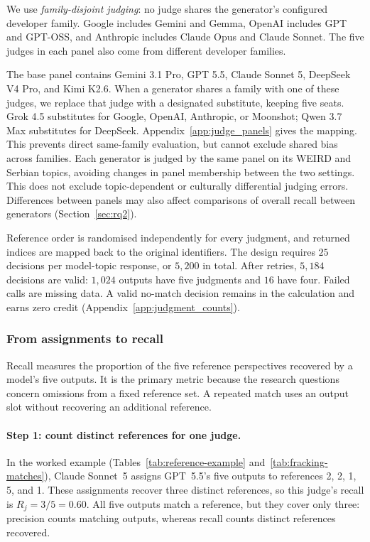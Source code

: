 \documentclass[11pt,a4paper]{article}
\begin{document}
We use \emph{family-disjoint judging}: no judge shares the generator's configured developer family. Google includes Gemini and Gemma, OpenAI includes GPT and GPT-OSS, and Anthropic includes Claude Opus and Claude Sonnet. The five judges in each panel also come from different developer families.

The base panel contains Gemini 3.1 Pro, GPT 5.5, Claude Sonnet 5, DeepSeek V4 Pro, and Kimi K2.6. When a generator shares a family with one of these judges, we replace that judge with a designated substitute, keeping five seats. Grok 4.5 substitutes for Google, OpenAI, Anthropic, or Moonshot; Qwen 3.7 Max substitutes for DeepSeek. Appendix~\ref{app:judge_panels} gives the mapping. This prevents direct same-family evaluation, but cannot exclude shared bias across families. Each generator is judged by the same panel on its WEIRD and Serbian topics, avoiding changes in panel membership between the two settings. This does not exclude topic-dependent or culturally differential judging errors. Differences between panels may also affect comparisons of overall recall between generators (Section~\ref{sec:rq2}).

Reference order is randomised independently for every judgment, and returned indices are mapped back to the original identifiers. The design requires $25$ decisions per model-topic response, or $5{,}200$ in total. After retries, $5{,}184$ decisions are valid: $1{,}024$ outputs have five judgments and $16$ have four. Failed calls are missing data. A valid no-match decision remains in the calculation and earns zero credit (Appendix~\ref{app:judgment_counts}).

\subsubsection{From assignments to recall}
\label{sec:recall}
Recall measures the proportion of the five reference perspectives recovered by a model's five outputs. It is the primary metric because the research questions concern omissions from a fixed reference set. A repeated match uses an output slot without recovering an additional reference.

\paragraph{Step 1: count distinct references for one judge.}
In the worked example (Tables~\ref{tab:reference-example} and~\ref{tab:fracking-matches}), Claude Sonnet~5 assigns GPT~5.5's five outputs to references 2, 2, 1, 5, and 1. These assignments recover three distinct references, so this judge's recall is $R_j=3/5=0.60$. All five outputs match a reference, but they cover only three: precision counts matching outputs, whereas recall counts distinct references recovered.
\end{document}

